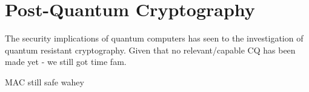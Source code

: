 \section{Post-Quantum Cryptography}
The security implications of quantum computers has seen to the investigation of quantum resistant cryptography. Given that no relevant/capable CQ has been made yet - we still got time fam.

MAC still safe wahey








